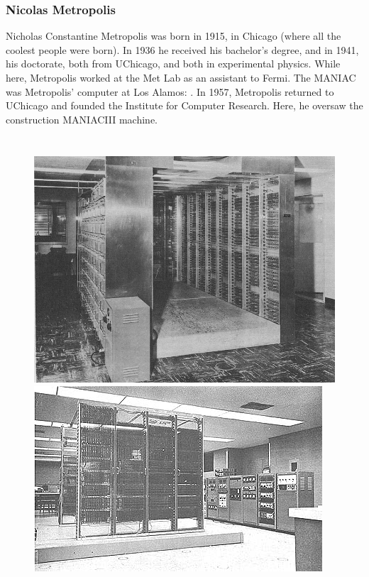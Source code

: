 \documentclass[hyperref={colorlinks=true}]{beamer}
\begin{document}

\begin{frame}[shrink=20]
  \frametitle{Nicolas Metropolis}
  
  Nicholas Constantine Metropolis was born in 1915, in Chicago (where all the coolest people were born). In 1936 he received his bachelor's degree, and in 1941, his doctorate, both from UChicago, and both in experimental physics. While here, Metropolis worked at the Met Lab as an assistant to Fermi. The MANIAC was Metropolis' computer at Los Alamos:  . In 1957, Metropolis returned to UChicago and founded the Institute for Computer Research. Here, he oversaw the construction MANIACIII machine.
  
  \vspace{-0.4cm}
  
  \begin{columns}
  
    
      \begin{figure}
        \centering
        \includegraphics[width=0.7\columnwidth]{MANIACII.jpg}\\
        \includegraphics[width=0.7\columnwidth]{MANIACIII.jpg}
      \end{figure}
    

\end{columns}
\end{frame}
\end{document}
